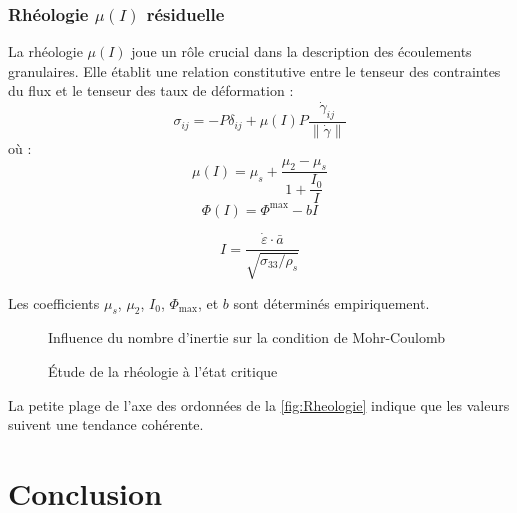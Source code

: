 \documentclass[a4paper,12pt]{report}
\begin{document}
\subsection{Rhéologie $\mu(I)$ résiduelle}

La rhéologie $\mu(I)$ joue un rôle crucial dans la description des écoulements granulaires. Elle établit une relation constitutive entre le tenseur des contraintes du flux et le tenseur des taux de déformation  \citep{jop2006constitutive} :
\begin{equation}
\sigma_{ij} = -P \delta_{ij} + \mu(I) P \frac{\dot{\gamma}_{ij}}{\lVert \dot{\gamma} \rVert}
\label{flowTensor}
\end{equation}
où :
\begin{equation}
\mu(I) = \mu_s + \dfrac{\mu_2 - \mu_s}{1 + \dfrac{I_0}{I}}
\label{muI}
\end{equation}
\begin{equation}
\Phi(I) = \Phi^{\max} - bI
\label{phiI}
\end{equation}

\begin{equation}
I =  \frac{\dot{\varepsilon} \cdot \bar{a}}{\sqrt{\sigma_{33}/\rho_s}}
\label{IMacro}
\end{equation}

Les coefficients $\mu_s$, $\mu_2$, $I_0$, $\Phi_{\max}$, et $b$ sont déterminés empiriquement.

\begin{figure}[h!]
    \centering
  \caption{Influence du nombre d’inertie sur la condition de Mohr-Coulomb}
  \label{fig:IResiduel}
\end{figure}

\begin{figure}[h!]
    \centering
    \subfloat[$\mu(I)$]{\scalebox{0.49}{}\label{fig:etudeSurI2}}
    \subfloat[$\Phi(I)$]{\scalebox{0.49}{}\label{fig:cercleResiduel2}}
  \caption{Étude de la rhéologie à l’état critique}
  \label{fig:Rheologie}
\end{figure}

La petite plage de l’axe des ordonnées de la \autoref{fig:Rheologie} indique que les valeurs suivent une tendance cohérente.

\chapter{Conclusion}
\end{document}

